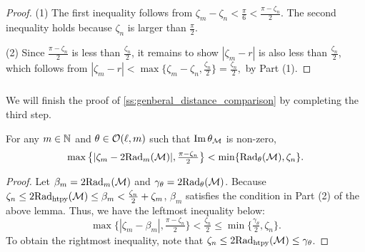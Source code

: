\begin{proof}
    	(1) The first inequality follows from $\zeta_m - \zeta_n < \tfrac{\pi}{6} < \tfrac{\pi - \zeta_n}{2}$.
        The second inequality holds because $\zeta_n$ is larger than $\tfrac{\pi}{2}$.

        (2) Since $\tfrac{\pi - \zeta_n}{2}$ is less than $\tfrac{\zeta_n}{2}$, it remains to show $|\zeta_m  - r |$ is also less than $\tfrac{\zeta_n}{2}$, which follows from
    	\(
    	|\zeta_m  - r | < \max\big\{\zeta_m - \zeta_n, \tfrac{\zeta_n}{2}\big\} = \tfrac{\zeta_n}{2},
    	\) by Part (1).
\end{proof}

\subsubsection{}
\label{sss:comparison_lemma_zeta_n}

We will finish the proof of \cref{ss:genberal_distance_comparison} by completing the third step.

\medskip \lemma
For any $m \in \mathbb{N}$ and $\theta \in \mathcal{O}(\ell, m)$ such that $\operatorname{Im} \theta_{\mathcal{M}}$ is non-zero,
\[\max\big\{|\zeta_m  - 2\mathrm{Rad}_{m}(\mathcal{M}) |, \tfrac{\pi - \zeta_n}{2}\big\} < \min\{\mathrm{Rad}_{\theta}(\mathcal{M}), \zeta_n\}.\]
\begin{proof}
    Let $\beta_m = 2\mathrm{Rad}_{m}(\mathcal{M})$ and $\gamma_\theta = 2\mathrm{Rad}_{\theta}(\mathcal{M})$.
    Because \(\zeta_n \leq 2\mathrm{Rad}_{\mathrm{htpy}}(\mathcal{M}) \leq \beta_m < \tfrac{\zeta_n}{2} + \zeta_m\), $\beta_m$ satisfies the condition in Part (2) of the above lemma.
    Thus, we have the leftmost inequality below:
    \[
    \max\big\{|\zeta_m - \beta_m|, \tfrac{\pi - \zeta_n}{2}\big\} < \tfrac{\zeta_n}{2}
    \leq
    \min\big\{\tfrac{\gamma_\theta}{2}, \zeta_n\big\}.
    \]
    To obtain the rightmost inequality, note that \(\zeta_n \leq 2\mathrm{Rad}_{\mathrm{htpy}}(\mathcal{M}) \leq \gamma_\theta\).
\end{proof}

